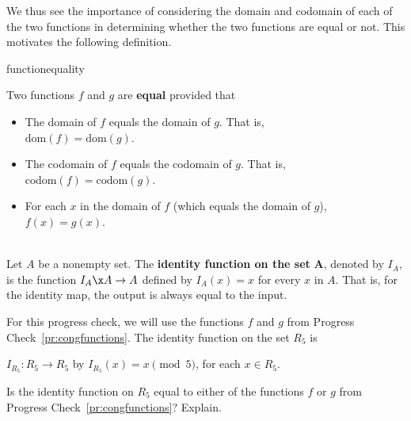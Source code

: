 We thus see the importance of considering the domain and codomain of each of the two functions in determining whether the two functions are equal or not.  This motivates the following definition. 
%
\begin{defbox}{functionequality}{Two functions  $f$  and  $g$  are \textbf{equal}
%
%
 provided that
\begin{itemize}
\item The domain of  $f$  equals the domain of  $g$.  That is, \\ 
$\text{dom}( f ) = \text{dom}( g )$.

\item The codomain of  $f$  equals the codomain of  $g$.  That is,  \\
$\text{codom}( f ) = \text{codom}( g )$.

\item For each  $x$  in the domain of  $f$  (which equals the domain of  $g$),  \\
$f( x ) = g( x )$.

\end{itemize}}
\end{defbox}
%
\begin{prog} \label{pr:equalfunc} \hfill \\
Let  $A$  be a nonempty set.  The \textbf{identity function on the set}
%
  $\boldsymbol{A}$, denoted by  $I_A $\label{sym:idfunc}, is the function  $I_A\x A \to A$ defined by  $I_A ( x ) = x$ for every  $x$  in  $A$.   That is, for the identity map, the output is always equal to the input.

For this progress check, we will use the functions $f$ and $g$ from Progress 
Check~\ref{pr:congfunctions}. The identity function on the set $R_5$ is 
\begin{center} 
$I_{R_5}:R_5  \to R_5$ by $I_{R_5}(x) = x \pmod 5$, for each $x \in R_5$.
\end{center}
Is the identity function on $R_5$ equal to either of the functions $f$ or $g$ from Progress 
Check~\ref{pr:congfunctions}?  Explain.
\end{prog}
\hbreak

\endinput
